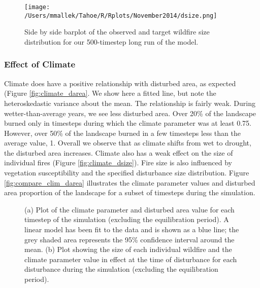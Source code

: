 \begin{figure}[!htbp]
\centering
\texttt{[image: /Users/mmallek/Tahoe/R/Rplots/November2014/dsize.png]}
\caption{Side by side barplot of the observed and target wildfire size distribution for our 500-timestep long run of the model.}
\label{fig:dsize}
\end{figure}



\subsubsection{Effect of Climate} Climate does have a positive relationship with disturbed area, as expected (Figure \ref{fig:climate_darea}. We show here a fitted line, but note the heteroskedastic variance about the mean. The relationship is fairly weak. During wetter-than-average years, we see less disturbed area. Over 20\% of the landscape burned only in timesteps during which the climate parameter was at least 0.75. However, over 50\% of the landscape burned in a few timesteps less than the average value, 1. Overall we observe that as climate shifts from wet to drought, the disturbed area increases. Climate also has a weak effect on the size of individual fires (Figure \ref{fig:climate_dsize}). Fire size is also influenced by vegetation susceptibility and the specified disturbance size distribution. Figure \ref{fig:compare_clim_darea} illustrates the climate parameter values and disturbed area proportion of the landscape for a subset of timesteps during the simulation.

\begin{figure}[!htbp]
  \centering
  \caption{(a) Plot of the climate parameter and disturbed area value for each timestep of the simulation (excluding the  equilibration period). A linear model has been fit to the data and is shown as a blue line; the grey shaded area represents  the 95\% confidence interval around the mean. (b) Plot showing the size of each individual wildfire and the climate parameter value in effect at the time of disturbance for each disturbance during the simulation (excluding the equilibration period).}
  \label{fig:climate_disturbance}
\end{figure}

